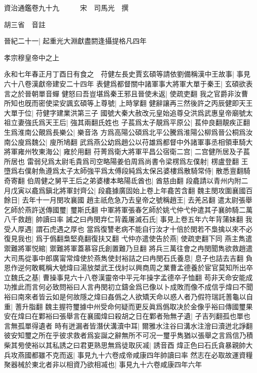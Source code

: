 資治通鑑卷九十九　　　宋　司馬光　撰

胡三省　音註

晉紀二十一|{
	起重光大淵獻盡閼逢攝提格凡四年}


孝宗穆皇帝中之上

永和七年春正月丁酉日有食之　苻健左長史賈玄碩等請依劉備稱漢中王故事|{
	事見六十八卷漢獻帝建安二十四年}
表健爲都督關中諸軍事大將軍大單于秦王|{
	玄碩欲表言之於晉朝單音蟬}
健怒曰吾豈堪爲秦王邪且晉使未返|{
	使疏吏翻}
我之官爵非汝曹所知也旣而密使梁安諷玄碩等上尊號|{
	上時掌翻}
健辭讓再三然後許之丙辰健即天王大單于位|{
	苻健字建業洪第三子}
國號大秦大赦改元皇始追尊殳洪爲武惠皇帝廟號太祖立妻強氏爲天王后|{
	強其兩翻氏姓也}
子萇爲太子靚爲平原公|{
	萇仲良翻靚疾正翻}
生爲淮南公覿爲長樂公|{
	樂音洛}
方爲高陽公碩爲北平公騰爲淮陽公柳爲晉公桐爲汝南公廋爲魏公|{
	廋所鳩翻}
武爲燕公幼爲趙公以苻雄爲都督中外諸軍事丞相領車騎大將軍雍州牧東海公|{
	雍於用翻}
苻菁爲衛大將軍平昌公宿衛二宫|{
	二宫健所居及子萇所居也}
雷弱兒爲太尉毛貴爲司空略陽姜伯周爲尚書令梁楞爲左僕射|{
	楞盧登翻}
王墮爲右僕射魚遵爲太子太師強平爲太傅段純爲太保呂婆樓爲散騎常侍|{
	散悉亶翻騎奇寄翻}
伯周健之舅平王后之弟婆樓本略陽氐酋也|{
	酋慈由翻}
段龕請以青州内附二月戊寅以龕爲鎭北將軍封齊公|{
	段龕據廣固始上卷上年龕苦含翻}
魏主閔攻圍襄國百餘日|{
	去年十一月閔攻襄國}
趙主祇危急乃去皇帝之號稱趙王|{
	去羌呂翻}
遣太尉張舉乞師於燕許送傳國璽|{
	璽斯氏翻}
中軍將軍張春乞師於姚弋仲弋仲遣其子襄帥騎二萬八千救趙|{
	帥讀曰率}
誡之曰冉閔弃仁背義屠滅石氏|{
	事見上卷五年六年背蒲妹翻}
我受人厚遇|{
	謂石虎遇之厚也}
當爲復讐老病不能自行汝才十倍於閔若不梟擒以來不必復見我也|{
	爲于僞翻梟堅堯翻復扶又翻}
弋仲亦遣使告於燕|{
	使疏吏翻下同}
燕主雋遣禦難將軍悦綰|{
	禦難將軍蓋慕容氏創置難乃旦翻}
將兵三萬往會之冉閔聞雋欲救趙遣大司馬從事中郎廣甯常煒使於燕雋使封裕詰之曰冉閔石氏養息|{
	息子也詰去吉翻}
負恩作逆何敢輒稱大號煒曰湯放桀武王伐紂以興商周之業曹孟德養於宦官莫知所出卒立魏氏之基|{
	曹操事見六十八卷漢靈帝中平元年操字孟德卒子恤翻}
苟非天命安能成功推此而言何必致問裕曰人言冉閔初立鑄金爲已像以卜成敗而像不成信乎煒曰不聞裕曰南來者皆云如是何故隱之煒曰姦僞之人欲矯天命以惑人者乃假符瑞託蓍龜以自重|{
	蓍升脂翻}
魏主握符璽據中州受命何疑而更反眞爲僞取决於金像乎裕曰傳國璽果安在煒曰在鄴裕曰張舉言在襄國煒曰殺胡之日在鄴者殆無孑遺|{
	孑吉列翻孤也單也言無孤單得遺者}
時有迸漏者皆潛伏溝瀆中耳|{
	爾雅水注谷曰溝水注澮曰瀆迸北諍翻}
彼安知璽之所在乎彼求救者爲妄誕之辭無所不可况一璽乎雋猶以張舉之言爲信乃積柴其㫄使裕以其私誘之曰君更熟思無爲徒取灰㓕|{
	誘音酉}
煒正色曰石氏貪暴親帥大兵攻燕國都雖不克而返|{
	事見九十六卷成帝咸康四年帥讀曰率}
然志在必取故運資糧聚器械於東北者非以相資乃欲相㓕也|{
	事見九十六卷咸康四年六年}
